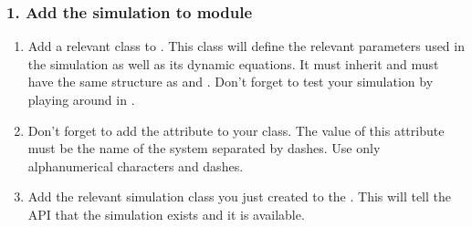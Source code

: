 \documentclass[a4paper,landscape,10pt,english]{sphinxmanual}
\begin{document}
\subsubsection{1. Add the simulation to  module}
\label{\detokenize{code_docs/new_simulation:add-the-simulation-to-simulations-module}}\begin{enumerate}
%
\item {} 
Add a relevant class to {\hyperref[\detokenize{code_docs/simulation_API.simulation:module-simulation_API.simulation.simulations}]{}}.
This class will define the relevant parameters used in the simulation as well
as its dynamic equations. It must inherit
{\hyperref[\detokenize{code_docs/simulation_API.simulation:simulation_API.simulation.simulations.Simulation}]{}}
and must have the same structure as
{\hyperref[\detokenize{code_docs/simulation_API.simulation:simulation_API.simulation.simulations.HarmonicOsc1D}]{}} and
{\hyperref[\detokenize{code_docs/simulation_API.simulation:simulation_API.simulation.simulations.ChenLeeAttractor}]{}}. Don’t
forget to test your simulation by playing around in
{\hyperref[\detokenize{code_docs/simulation_API.simulation:module-simulation_API.simulation.demo_run_simulation}]{}}.

\item {} 
Don’t forget to add the attribute
{\hyperref[\detokenize{code_docs/simulation_API.simulation:simulation_API.simulation.simulations.Simulation.system}]{}} to your
class. The value of this attribute must be the name of the system separated
by dashes. Use only alphanumerical characters and dashes.

\item {} 
Add the relevant simulation class you just created to the 
{\hyperref[\detokenize{code_docs/simulation_API.simulation:simulation_API.simulation.simulations.Simulations}]{}}. This will tell
the API that the simulation exists and it is available.

\end{enumerate}
\end{document}
